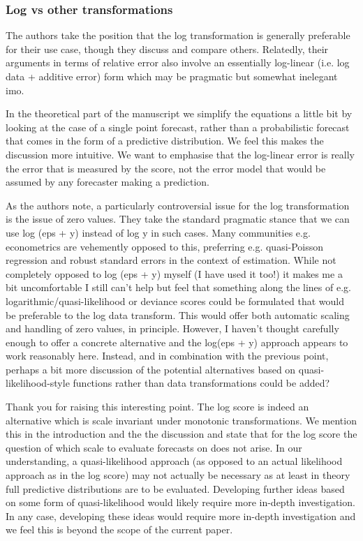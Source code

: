 \documentclass{article}
\newcommand{\black}{\color{black}}
\newcommand{\blue}{\color{blue}}
\begin{document}
\blue
\subsubsection{Log vs other transformations}
The authors take the position that the log transformation is generally preferable for their use case, though they discuss and compare others. Relatedly, their arguments in terms of relative error also involve an essentially log-linear (i.e. log data + additive error) form which may be pragmatic but somewhat inelegant imo.

\black
In the theoretical part of the manuscript we simplify the equations a little bit by looking at the case of a single point forecast, rather than a probabilistic forecast that comes in the form of a predictive distribution. We feel this makes the discussion more intuitive. We want to emphasise that the log-linear error is really the error that is measured by the score, not the error model that would be assumed by any forecaster making a prediction. 


\blue
As the authors note, a particularly controversial issue for the log transformation is the issue of zero values. They take the standard pragmatic stance that we can use log (eps + y) instead of log y in such cases. Many communities e.g. econometrics are vehemently opposed to this, preferring e.g. quasi-Poisson regression and robust standard errors in the context of estimation. While not completely opposed to log (eps + y) myself (I have used it too!) it makes me a bit uncomfortable I still can’t help but feel that something along the lines of e.g. logarithmic/quasi-likelihood or deviance scores could be formulated that would be preferable to the log data transform. This would offer both automatic scaling and handling of zero values, in principle. However, I haven’t thought carefully enough to offer a concrete alternative and the log(eps + y) approach appears to work reasonably here. Instead, and in combination with the previous point, perhaps a bit more discussion of the potential alternatives based on quasi-likelihood-style functions rather than data transformations could be added?

\black
Thank you for raising this interesting point. The log score is indeed an alternative which is scale invariant under monotonic transformations. We mention this in the introduction and the the discussion and state that for the log score the question of which scale to evaluate forecasts on does not arise. In our understanding, a quasi-likelihood approach (as opposed to an actual likelihood approach as in the log score) may not actually be necessary as at least in theory full predictive distributions are to be evaluated. Developing further ideas based on some form of quasi-likelihood would likely require more in-depth investigation. In any case, developing these ideas would require more in-depth investigation and we feel this is beyond the scope of the current paper. 
\end{document}
